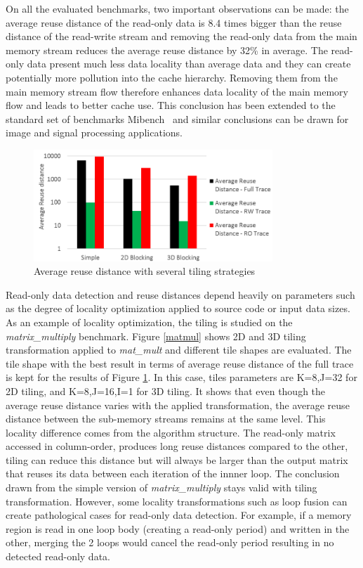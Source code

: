 \documentclass[sigconf]{acmart}
\begin{document}
On all the evaluated benchmarks, two important observations can be made: the average reuse distance of the read-only data is 8.4 times bigger than the reuse distance of the read-write stream and removing the read-only data from the main memory stream reduces the average reuse distance by 32\% in average. The read-only data present much less data locality than average data and they can create potentially more pollution into the cache hierarchy. Removing them from the main memory stream flow therefore enhances data locality of the main memory flow and leads to better cache use. This conclusion has been extended to the standard set of benchmarks Mibench~\cite{vaumourin:2014} and similar conclusions can be drawn for image and signal processing applications. 


\begin{figure}
    \centering
    \includegraphics[width=9cm]{./images/blocking1.png}
     \caption{Average reuse distance with several tiling strategies}
    \label{blocking}
\end{figure}

Read-only data detection and reuse distances depend heavily on parameters such as the degree of locality optimization applied to source code or input data sizes. As an example of locality optimization, the tiling is studied on the \textit{matrix\_multiply} benchmark. Figure \ref{matmul} shows 2D and 3D tiling transformation applied to \textit{mat\_mult} and different tile shapes are evaluated. The tile shape with the best result in terms of average reuse distance of the full trace is kept for the results of Figure \ref{blocking}. In this case, tiles parameters are K=8,J=32 for 2D tiling, and K=8,J=16,I=1 for 3D tiling. It shows that even though the average reuse distance varies with the applied transformation, the average reuse distance between the sub-memory streams remains at the same level. This locality difference comes from the algorithm structure. The read-only matrix accessed in column-order, produces long reuse distances compared to the other, tiling can reduce this distance but will always be larger than the output matrix that reuses its data between each iteration of the innner loop.  The conclusion drawn from the simple version of \textit{matrix\_multiply} stays valid with tiling transformation. However, some locality transformations such as loop fusion can create pathological cases for read-only data detection. For example, if a memory region is read in one loop body (creating a read-only period) and written in the other, merging the 2 loops would cancel the read-only period resulting in no detected read-only data. 
\end{document}
